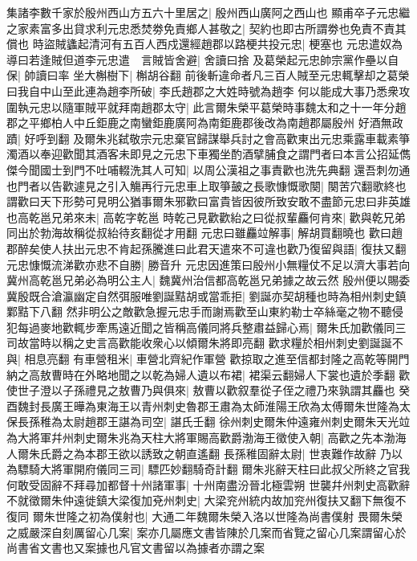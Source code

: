 集諸李數千家於殷州西山方五六十里居之|{
	殷州西山廣阿之西山也}
顯甫卒子元忠繼之家素富多出貸求利元忠悉焚劵免責鄉人甚敬之|{
	契約也即古所謂劵也免責不責其償也}
時盜賊蠭起清河有五百人西戍還經趙郡以路梗共投元忠|{
	梗塞也}
元忠遣奴為導曰若逢賊但道李元忠遣　言賊皆舍避|{
	舍讀曰捨}
及葛榮起元忠帥宗黨作壘以自保|{
	帥讀曰率}
坐大槲樹下|{
	槲胡谷翻}
前後斬違命者凡三百人賊至元忠輒擊却之葛榮曰我自中山至此連為趙李所破|{
	李氏趙郡之大姓時號為趙李}
何以能成大事乃悉衆攻圍執元忠以隨軍賊平就拜南趙郡太守|{
	此言爾朱榮平葛榮時事魏太和之十一年分趙郡之平鄉柏人中丘鉅鹿之南蠻鉅鹿廣阿為南鉅鹿郡後改為南趙郡屬殷州}
好酒無政蹟|{
	好呼到翻}
及爾朱兆弑敬宗元忠棄官歸謀舉兵討之會高歡東出元忠乘露車載素箏濁酒以奉迎歡聞其酒客未即見之元忠下車獨坐酌酒擘脯食之謂門者曰本言公招延儁傑今聞國士到門不吐哺輟洗其人可知|{
	以周公漢祖之事責歡也洗先典翻}
還吾刺勿通也門者以告歡遽見之引入觴再行元忠車上取箏皷之長歌慷慨歌闋|{
	闋苦穴翻歌終也}
謂歡曰天下形勢可見明公猶事爾朱邪歡曰富貴皆因彼所致安敢不盡節元忠曰非英雄也高乾邕兄弟來未|{
	高乾字乾邕}
時乾己見歡歡紿之曰從叔輩麤何肯來|{
	歡與乾兄弟同出於勃海故稱從叔紿待亥翻從才用翻}
元忠曰雖麤竝解事|{
	解胡買翻曉也}
歡曰趙郡醉矣使人扶出元忠不肯起孫騰進曰此君天遣來不可違也歡乃復留與語|{
	復扶又翻}
元忠慷慨流涕歡亦悲不自勝|{
	勝音升}
元忠因進策曰殷州小無糧仗不足以濟大事若向冀州高乾邕兄弟必為明公主人|{
	魏冀州治信都高乾邕兄弟據之故云然}
殷州便以賜委冀殷既合滄瀛幽定自然弭服唯劉誕黠胡或當乖拒|{
	劉誕亦契胡種也時為相州刺史鎮鄴黠下八翻}
然非明公之敵歡急握元忠手而謝焉歡至山東約勒士卒絲毫之物不聽侵犯每過麥地歡輒步牽馬遠近聞之皆稱高儀同將兵整肅益歸心焉|{
	爾朱氏加歡儀同三司故當時以稱之史言高歡能收衆心以傾爾朱將即亮翻}
歡求糧於相州刺史劉誕誕不與|{
	相息亮翻}
有車營租米|{
	車營北齊紀作軍營}
歡掠取之進至信都封隆之高乾等開門納之高敖曹時在外略地聞之以乾為婦人遺以布裙|{
	裙渠云翻婦人下裳也遺於季翻}
歡使世子澄以子孫禮見之敖曹乃與俱來|{
	敖曹以歡叙羣從子侄之禮乃來孰謂其麤也}
癸酉魏封長廣王曄為東海王以青州刺史魯郡王肅為太師淮陽王欣為太傅爾朱世隆為太保長孫稚為太尉趙郡王諶為司空|{
	諶氏壬翻}
徐州刺史爾朱仲遠雍州刺史爾朱天光竝為大將軍幷州刺史爾朱兆為天柱大將軍賜高歡爵渤海王徵使入朝|{
	高歡之先本渤海人爾朱氏爵之為本郡王欲以誘致之朝直遙翻}
長孫稚固辭太尉|{
	世衷難作故辭}
乃以為驃騎大將軍開府儀同三司|{
	驃匹妙翻騎奇計翻}
爾朱兆辭天柱曰此叔父所終之官我何敢受固辭不拜尋加都督十州諸軍事|{
	十州南盡汾晉北極雲朔}
世襲幷州刺史高歡辭不就徵爾朱仲遠徙鎮大梁復加兗州刺史|{
	大梁兖州統内故加兖州復扶又翻下無復不復同}
爾朱世隆之初為僕射也|{
	大通二年魏爾朱榮入洛以世隆為尚書僕射}
畏爾朱榮之威嚴深自刻厲留心几案|{
	案亦几屬應文書皆陳於几案而省覽之留心几案謂留心於尚書省文書也又案據也凡官文書留以為據者亦謂之案}
